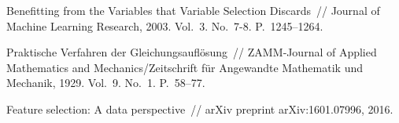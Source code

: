 \documentclass[12pt,twoside]{article}
\begin{document}
\begin{thebibliography}{10}
{Benefitting from the Variables that Variable Selection Discards}~//
Journal of Machine Learning Research, 2003.
Vol.~3.
No.~7-8.
P.~1245--1264.

{Praktische Verfahren der Gleichungsauflösung}~//
ZAMM‐Journal of Applied Mathematics and Mechanics/Zeitschrift für Angewandte Mathematik und Mechanik, 1929.
Vol.~9.
No.~1.
P.~58--77.

{Feature selection: A data perspective}~//
arXiv preprint arXiv:1601.07996, 2016.


\end{thebibliography}
\end{document}
